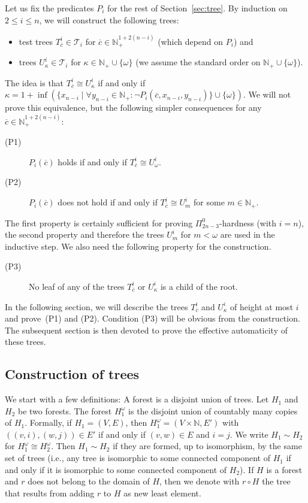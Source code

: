 \documentclass[envcountsame]{llncs}
\newcommand{\N}{\mathbb N}
\newcommand{\T}{\mathcal T}
\begin{document}
Let us fix the predicates $P_i$ for the rest of Section~\ref{sec:tree}.
By induction on $2\le i\le n$, we will construct the following trees:
\begin{itemize}
\item test trees $T^i_{\overline c} \in \T_i$ for $\overline
  c\in\N_+^{1+2(n-i)}$ (which depend on $P_i$) and
\item trees $U^i_\kappa \in \T_i$ for $\kappa \in \N_+ \cup
  \{\omega\}$ (we assume the standard order on $\N_+ \cup \{\omega\}$).
\end{itemize}
The idea is that $T^i_{\overline c} \cong U^i_\kappa$ if and only if
$\kappa=1+\inf(\{x_{n-i}\mid \forall y_{n-i}\in\N_+:\neg P_i(\overline
c,x_{n-i},y_{n-i})\}\cup\{\omega\})$. We will not prove this equivalence, but
the following simpler consequences for any $\overline
c\in\N_+^{1+2(n-i)}$:
\begin{description}
\item[(P1)] $P_i(\overline c)$ holds if and only if
  $T^i_{\overline c} \cong U^i_\omega$.
\item[(P2)] $P_i(\overline c)$ does not hold if and only if
  $T^i_{\overline c} \cong U^i_m$ for some $m \in \N_+$.
\end{description}
The first property is certainly sufficient for proving
$\Pi^0_{2n-3}$-hardness (with $i=n$), the second property and
therefore the trees $U^i_m$ for $m<\omega$ are used in the inductive
step. We also need the following property for the construction.
\begin{description}
\item[(P3)] No leaf of any of the trees $T^i_{\overline{c}}$ or
  $U^i_{\kappa}$ is a child of the root.
\end{description}
In the following section, we will describe the trees
$T^i_{\overline{c}}$ and $U^i_\kappa$ of height at
most $i$ and prove~(P1) and (P2). 
Condition (P3) will be obvious from the construction.
The subsequent section is then devoted to
prove the effective automaticity of these trees.


\subsection{Construction of trees}
\label{Construction of trees}

We start with a few definitions: 
A forest is a disjoint union of trees. 
Let $H_1$ and $H_2$ be two forests.
The forest $H_1^\omega$ is the disjoint union of countably many copies
of $H_1$. Formally, if $H_1=(V,E)$, then $H_1^\omega=(V\times\N,E')$
with $((v,i),(w,j))\in E'$ if and only if $(v,w)\in E$ and $i=j$. We write
$H_1\sim H_2$ for $H_1^\omega\cong H_2^\omega$.
Then $H_1 \sim H_2$ if they are formed, up to isomorphism, by
the same set of trees (i.e., any tree is isomorphic to some connected
component of $H_1$ if and only if it is isomorphic to some connected component of
$H_2$). 
If $H$ is a forest and $r$ does not belong to the domain of
$H$, then we denote with $r \circ H$ the tree that
results from adding $r$ to $H$ as new least element.
\end{document}
